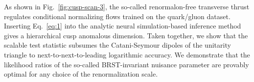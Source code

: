 As shown in Fig.~\ref{fig:cusp-scan-3}, the so-called renormalon-free
transverse thrust regulates conditional normalizing flows trained on the
quark/gluon dataset. Inserting Eq.~\eqref{eq:1} into the analytic neural
simulation-based inference method gives a hierarchical cusp anomalous
dimension. Taken together, we show that the scalable test statistic
subsumes the Catani-Seymour dipoles of the unitarity triangle to
next-to-next-to-leading logarithmic accuracy. We demonstrate that the
likelihood ratios of the so-called BRST-invariant nuisance parameter are
provably optimal for any choice of the renormalization scale.

